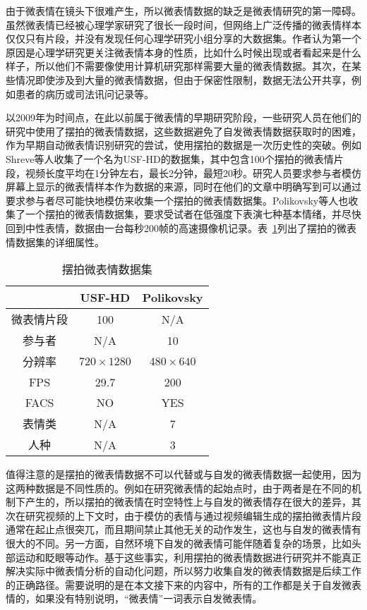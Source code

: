 由于微表情在镜头下很难产生，所以微表情数据的缺乏是微表情研究的第一障碍。虽然微表情已经被心理学家研究了很长一段时间，但网络上广泛传播的微表情样本仅仅只有片段，并没有发现任何心理学研究小组分享的大数据集。作者认为第一个原因是心理学研究更关注微表情本身的性质，比如什么时候出现或者看起来是什么样子，所以他们不需要像使用计算机研究那样需要大量的微表情数据。其次，在某些情况即使涉及到大量的微表情数据，但由于保密性限制，数据无法公开共享，例如患者的病历或司法讯问记录等。

以2009年为时间点，在此以前属于微表情的早期研究阶段，一些研究人员在他们的研究中使用了摆拍的微表情数据，这些数据避免了自发微表情数据获取时的困难，作为早期自动微表情识别研究的尝试，使用摆拍的数据是一次历史性的突破。例如Shreve等人收集了一个名为USF-HD的数据集，其中包含100个摆拍的微表情片段，视频长度平均在1分钟左右，最长2分钟，最短20秒。研究人员要求参与者模仿屏幕上显示的微表情样本作为数据的来源，同时在他们的文章中明确写到可以通过要求参与者尽可能快地模仿来收集一个摆拍的微表情数据集。Polikovsky等人也收集了一个摆拍的微表情数据集，要求受试者在低强度下表演七种基本情绪，并尽快回到中性表情，数据由一台每秒200帧的高速摄像机记录。表~\ref{tab3}列出了摆拍的微表情数据集的详细属性。

\begin{table}[!htbp]
\centering
\caption{摆拍微表情数据集}
\label{tab3}
\footnotesize%
\setlength{\tabcolsep}{4pt}%
\renewcommand{\arraystretch}{1.2}%
\begin{tabular}{c|cc}
\hline
 & USF-HD & Polikovsky \\ \hline
微表情片段 & 100 & N/A \\
参与者 & N/A & 10 \\
分辨率 & $720\times1280$ & $480\times640$ \\
FPS & 29.7 & 200 \\
FACS & NO & YES \\
表情类 & N/A & 7 \\
人种 & N/A & 3 \\ \hline
\end{tabular}
\end{table}

值得注意的是摆拍的微表情数据不可以代替或与自发的微表情数据一起使用，因为这两种数据是不同性质的。例如在研究微表情的起始点时，由于两者是在不同的机制下产生的，所以摆拍的微表情在时空特性上与自发的微表情存在很大的差异，其次在研究视频的上下文时，由于模仿的表情与通过视频编辑生成的摆拍微表情片段通常在起止点很突兀，而且期间禁止其他无关的动作发生，这也与自发的微表情有很大的不同。另一方面，自然环境下自发的微表情可能伴随着复杂的场景，比如头部运动和眨眼等动作。基于这些事实，利用摆拍的微表情数据进行研究并不能真正解决实际中微表情分析的自动化问题，所以努力收集自发的微表情数据是后续工作的正确路径。需要说明的是在本文接下来的内容中，所有的工作都是关于自发微表情的，如果没有特别说明，“微表情”一词表示自发微表情。

